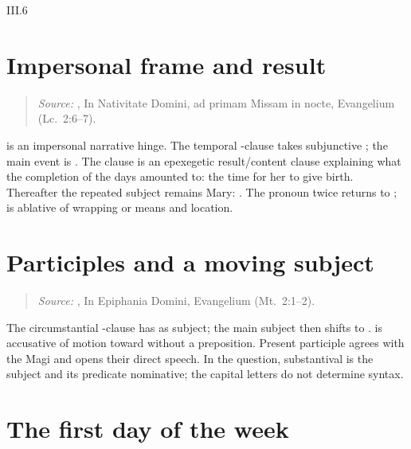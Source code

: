 \begin{courseunit}{III.6}
\section{Impersonal frame and result}

\begin{quote}

\emph{Source:} \Missal, In Nativitate Domini, ad primam Missam in nocte,
Evangelium (Lc.~2:6--7).
\end{quote}

 is an impersonal narrative hinge. The temporal
-clause takes subjunctive ; the main event is
. The clause  is an epexegetic
result/content clause explaining what the completion of the days amounted to:
the time for her to give birth. Thereafter the repeated subject remains
Mary: . The pronoun  twice
returns to ;  is ablative of wrapping or means and
 location.

\section{Participles and a moving subject}

\begin{quote}

\emph{Source:} \Missal, In Epiphania Domini, Evangelium (Mt.~2:1--2).
\end{quote}

The circumstantial -clause has  as subject; the main subject
then shifts to .  is accusative of motion toward
without a preposition. Present participle  agrees with the Magi
and opens their direct speech. In the question, substantival  is the subject and  its predicate nominative; the capital letters
do not determine syntax.

\section{The first day of the week}


\end{courseunit}

